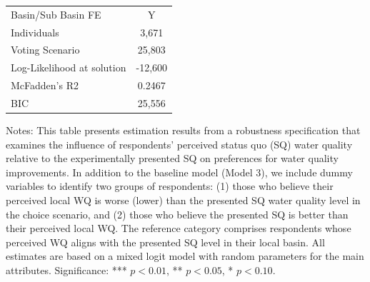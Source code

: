 {\begin{table}[!htbp]
{\begin{tabular}{lll}
\midrule
  Basin/Sub Basin FE & \multicolumn{2}{c}{Y}  \\ 
  Individuals & \multicolumn{2}{c}{3,671}  \\ 
  Voting Scenario & \multicolumn{2}{c}{25,803}  \\ 
  Log-Likelihood at solution & \multicolumn{2}{c}{-12,600}  \\ 
  McFadden’s R2 & \multicolumn{2}{c}{0.2467}  \\ 
  BIC & \multicolumn{2}{c}{25,556}  \\ 
   \midrule
\end{tabular}
}
\begin{minipage}{16cm}  
\singlespacing  
\vspace{0.01cm}  
\footnotesize Notes: This table presents estimation results from a robustness specification that examines the 
influence of respondents' perceived status quo (SQ) water quality relative to the experimentally presented SQ 
on preferences for water quality improvements. In addition to the baseline model (Model 3), we include dummy 
variables to identify two groups of respondents: (1) those who believe their perceived local WQ is worse (lower) 
than the presented SQ water quality level in the choice scenario, and (2) those who believe the presented SQ is 
better than their perceived local WQ. The reference category comprises respondents whose perceived WQ aligns with 
the presented SQ level in their local basin. All estimates are based on a mixed logit model with random parameters 
for the main attributes.
Significance: *** $p < 0.01$, ** $p < 0.05$, * $p < 0.10$. 
\end{minipage}
\end{table}
}
